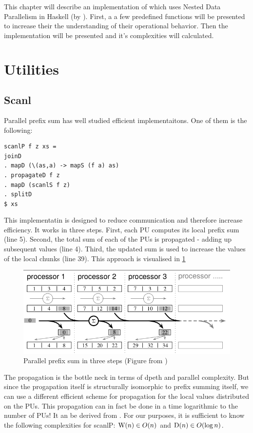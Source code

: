 

This chapter will describe an implementation of \algo which uses
Nested Data Parallelism in Haskell (by \cite{Harness2008}).
First, a a few predefined functions will be presented to
increase their the understanding of their operational behavior.
Then the implementation will be presented and it's complexities will
calculated.

\section{Utilities}

  \subsection{Scanl}
    Parallel prefix sum has well studied efficient implementaitons. One of them
    is the following:
    \begin{lstlisting}   
scanlP f z xs =
joinD
. mapD (\(as,a) -> mapS (f a) as)
. propagateD f z
. mapD (scanlS f z)
. splitD
$ xs
    \end{lstlisting}
    This implementatin is designed to reduce communication
    and therefore increase efficiency. It works in three steps.
    First, each PU computes its local prefix sum (line 5).
    Second, the total sum of each of the PUs is propagated
    - adding up subsequent values (line 4).
    Third, the updated sum is used to increase the values of the local chunks (line 39).
    This approach is visualised in \ref{figure:scanlPsteps}
    
    \begin{figure}[h!]
        \includegraphics[width=\linewidth]{scanlP-three-steps.png}
        \caption{Parallel prefix sum in three steps (Figure from \cite{DistTypes1999}) }
        \label{figure:scanlPsteps}
    \end{figure}
    The propagation is the bottle neck in terms of dpeth and parallel complexity.
    But since the progapation itself is structurally isomorphic to prefix summing itself,
    we can use a different efficient scheme for propagation for the local values distributed on the PUs.
    This propagation can in fact be done in a time logarithmic to the number of PUs!
    It an be derived from \cite{Scanl1980}. For our purposes, it is sufficient to know the following complexities for scanlP:
    $\textrm{W}(n) \in O(n)$ and $\textrm{D}(n) \in O(\log n)$.

